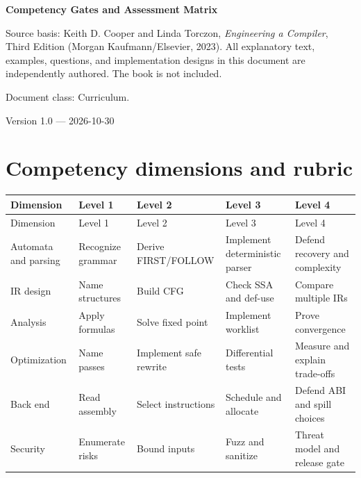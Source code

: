 \documentclass[10pt,letterpaper]{article}
\begin{document}
\begin{titlepage}
\centering\vspace*{1.0in}
{\Huge\bfseries\textcolor{CompilerBlue}{Competency Gates and Assessment Matrix}\par}
\vspace{.22in}{\Large Measurable progression independent of calendar duration\par}
\vspace{.4in}{\large Compiler Engineering Documentation Suite\par}
\vfill
\begin{minipage}{.86\linewidth}\small
Source basis: Keith D. Cooper and Linda Torczon, \emph{Engineering a Compiler}, Third Edition (Morgan Kaufmann/Elsevier, 2023). All explanatory text, examples, questions, and implementation designs in this document are independently authored. The book is not included.\par\medskip
Document class: Curriculum.
\end{minipage}
\vfill\textcolor{CompilerGray}{Version 1.0 --- 2026-10-30}\par
\end{titlepage}
\tableofcontents\clearpage
\section{Competency dimensions and rubric}
\begin{longtable}{|>{\raggedright\arraybackslash}p{}|>{\raggedright\arraybackslash}p{}|>{\raggedright\arraybackslash}p{}|>{\raggedright\arraybackslash}p{}|>{\raggedright\arraybackslash}p{}|}
\hline
Dimension & Level 1 & Level 2 & Level 3 & Level 4\\ \hline\endfirsthead
\hline
Dimension & Level 1 & Level 2 & Level 3 & Level 4\\ \hline\endhead
Automata and parsing & Recognize grammar & Derive FIRST/FOLLOW & Implement deterministic parser & Defend recovery and complexity\\ \hline
IR design & Name structures & Build CFG & Check SSA and def-use & Compare multiple IRs\\ \hline
Analysis & Apply formulas & Solve fixed point & Implement worklist & Prove convergence\\ \hline
Optimization & Name passes & Implement safe rewrite & Differential tests & Measure and explain trade-offs\\ \hline
Back end & Read assembly & Select instructions & Schedule and allocate & Defend ABI and spill choices\\ \hline
Security & Enumerate risks & Bound inputs & Fuzz and sanitize & Threat model and release gate\\ \hline
\end{longtable}
\end{document}
